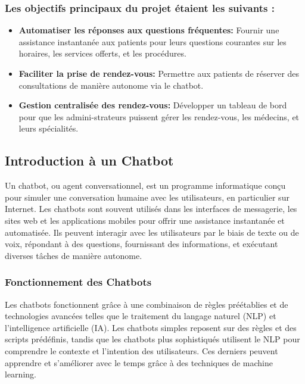\subsubsection{Les objectifs principaux du projet étaient les suivants :}
\begin{itemize}
  \item \textbf{Automatiser les réponses aux questions fréquentes: }Fournir une assistance instantanée aux patients pour leurs questions courantes sur les horaires, les services offerts, et les procédures.
  \item \textbf{Faciliter la prise de rendez-vous: }Permettre aux patients de réserver des consultations de manière autonome via le chatbot.
  \item \textbf{Gestion centralisée des rendez-vous: }Développer un tableau de bord pour que les admini-strateurs puissent gérer les rendez-vous, les médecins, et leurs spécialités.
\end{itemize}

\subsection{Introduction à un Chatbot}

\hspace{16pt}Un chatbot, ou agent conversationnel, est un programme informatique conçu pour simuler une conversation humaine avec les utilisateurs, en particulier sur Internet. Les chatbots sont souvent utilisés dans les interfaces de messagerie, les sites web et les applications mobiles pour offrir une assistance instantanée et automatisée. Ils peuvent interagir avec les utilisateurs par le biais de texte ou de voix, répondant à des questions, fournissant des informations, et exécutant diverses tâches de manière autonome.

\subsubsection{Fonctionnement des Chatbots}

\hspace{16pt}Les chatbots fonctionnent grâce à une combinaison de règles préétablies et de technologies avancées telles que le traitement du langage naturel (NLP) et l'intelligence artificielle (IA). Les chatbots simples reposent sur des règles et des scripts prédéfinis, tandis que les chatbots plus sophistiqués utilisent le NLP pour comprendre le contexte et l'intention des utilisateurs. Ces derniers peuvent apprendre et s'améliorer avec le temps grâce à des techniques de machine learning.

